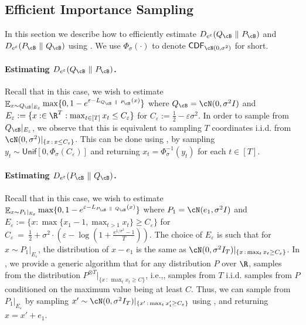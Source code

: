 \documentclass[twoside]{article}
\theoremstyle{definition}
\DeclareMathOperator*{\Ex}{\mathbb{E}}
\newcommand{\eps}{\varepsilon}
\newcommand{\prn}[1]{\left ( #1 \right )}
\newcommand{\Deps}{D_{e^{\eps}}}
\newcommand{\PB}{P_{\cB}}
\newcommand{\QB}{Q_{\cB}}
\newcommand{\CDF}{\mathsf{CDF}}
\newcommand{\Unif}{\mathsf{Unif}}
\begin{document}
\subsection{Efficient Importance Sampling}\label{subapp:importance}

In this section we describe how to efficiently estimate $\Deps(\QB ~\|~ \PB)$ and $\Deps(\PB ~\|~ \QB)$ using . We use $\Phi_\sigma(\cdot)$ to denote $\CDF_{\cN(0, \sigma^2)}$ for short.

\paragraph{\boldmath Estimating $\Deps(\QB ~\|~ \PB)$.} Recall that in this case, we wish to estimate $\Ex_{x \sim \QB |_{E_\eps}} \max\{0, 1 - e^{\eps - L_{\QB ~\|~ \PB}(x)}\}$ where $\QB = \cN(0, \sigma^2 I)$ and $E_\eps := \{x :\in \R^T : \max_{t \in [T]} x_t \le C_{\eps}\}$ for $C_\eps := \frac12 - \eps \sigma^2$. In order to sample from $\QB|_{E_\eps}$, we observe that this is equivalent to sampling $T$ coordinates i.i.d. from $\cN(0, \sigma^2)|_{\{x \,:\, x \le C_{\eps}\}}$. This can be done using , by sampling $y_t \sim \Unif[0, \Phi_\sigma(C_\eps)]$ and returning $x_t = \Phi_\sigma^{-1}(y_t)$ for each $t \in [T]$.

\paragraph{\boldmath Estimating $\Deps(\PB ~\|~ \QB)$.} Recall that in this case, we wish to estimate $\Ex_{x \sim P_1 |_{E_\eps}} \max\{0, 1 - e^{\eps - L_{\PB ~\|~ \QB}(x)}\}$ where $P_1 = \cN(e_1, \sigma^2 I)$ and $E_\eps := \{ x : \max\{ x_1 - 1, \max_{t > 1} x_t\} \ge C_\eps \}$ for
$C_{\eps} ~=~ \frac{1}{2} + \sigma^2 \cdot \prn{\eps - \log\prn{1 + \frac{e^{1/\sigma^2} - 1}{T}}}$.
The choice of $E_{\eps}$ is such that for $x \sim P_1 |_{E_\eps}$, the distribution of $x - e_1$ is the same as $\cN(0, \sigma^2 I_T)|_{\{x\,:\,\max_t x_t \ge C_\eps\}}$.
In , we provide a generic algorithm that for any distribution $P$ over $\R$, samples from the distribution $P^{\otimes T}|_{\{x\, :\, \max_t x_t \ge C\}}$, i.e.,, samples from $T$ i.i.d. samples from $P$ conditioned on the maximum value being at least $C$.
Thus, we can sample from $P_1|_{E_\eps}$ by sampling $x' \sim \cN(0, \sigma^2 I_T)|_{\{x' \,:\,\max_t x'_t \ge C_{\eps}\}}$ using , and returning $x = x' + e_1$.
\end{document}
